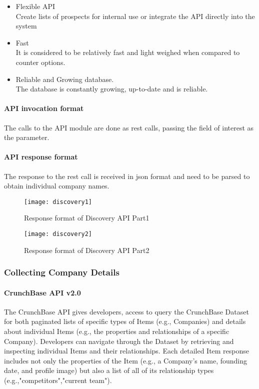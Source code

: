 \begin{itemize}
\item Flexible API \\ Create lists of prospects for internal use or integrate the API directly into the system
\item Fast \\ It is considered to be relatively fast and light weighed when compared to counter options.
\item Reliable and Growing database. \\The database is constantly growing, up-to-date and is reliable.
\end{itemize}
\paragraph*{API invocation format}
\hfill
\par The calls to the API module are done as rest calls, passing the field of interest as the parameter.
\paragraph*{API response format}
\hfill \break
The response to the rest call is received in json format and need to be parsed to obtain individual company names.
\begin{figure}[h]
	\texttt{[image: discovery1]}
	\centering
	\caption{Response format of Discovery API Part1}
\end{figure}
\begin{figure}[h]
	\texttt{[image: discovery2]}
	\centering
	\caption{Response format of Discovery API Part2}
\end{figure}
\subsubsection{Collecting Company Details}
\paragraph*{CrunchBase API v2.0}
\hfill \break
The CrunchBase API gives developers, access to query the CrunchBase Dataset for both paginated lists of specific types of Items (e.g., Companies) and details about individual Items (e.g., the properties and relationships of a specific Company).
Developers can navigate through the Dataset by retrieving and inspecting individual Items and their relationships. Each detailed Item response includes not only the properties of the Item (e.g., a Company's name, founding date, and profile image) but also a list of all of its relationship types (e.g.,"competitors","current team").
